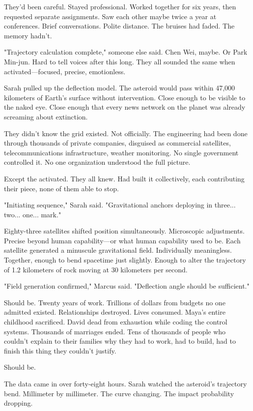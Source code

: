 They'd been careful. Stayed professional. Worked together for six years, then requested separate assignments. Saw each other maybe twice a year at conferences. Brief conversations. Polite distance. The bruises had faded. The memory hadn't.

"Trajectory calculation complete," someone else said. Chen Wei, maybe. Or Park Min-jun. Hard to tell voices after this long. They all sounded the same when activated—focused, precise, emotionless.

Sarah pulled up the deflection model. The asteroid would pass within 47,000 kilometers of Earth's surface without intervention. Close enough to be visible to the naked eye. Close enough that every news network on the planet was already screaming about extinction.

They didn't know the grid existed. Not officially. The engineering had been done through thousands of private companies, disguised as commercial satellites, telecommunications infrastructure, weather monitoring. No single government controlled it. No one organization understood the full picture.

Except the activated. They all knew. Had built it collectively, each contributing their piece, none of them able to stop.

"Initiating sequence," Sarah said. "Gravitational anchors deploying in three... two... one... mark."

Eighty-three satellites shifted position simultaneously. Microscopic adjustments. Precise beyond human capability—or what human capability used to be. Each satellite generated a minuscule gravitational field. Individually meaningless. Together, enough to bend spacetime just slightly. Enough to alter the trajectory of 1.2 kilometers of rock moving at 30 kilometers per second.

"Field generation confirmed," Marcus said. "Deflection angle should be sufficient."

Should be. Twenty years of work. Trillions of dollars from budgets no one admitted existed. Relationships destroyed. Lives consumed. Maya's entire childhood sacrificed. David dead from exhaustion while coding the control systems. Thousands of marriages ended. Tens of thousands of people who couldn't explain to their families why they had to work, had to build, had to finish this thing they couldn't justify.

Should be.

The data came in over forty-eight hours. Sarah watched the asteroid's trajectory bend. Millimeter by millimeter. The curve changing. The impact probability dropping.

